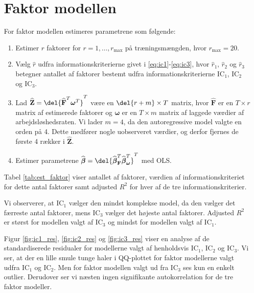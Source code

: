 \section{Faktor modellen}
For faktor modellen estimeres parametrene som følgende:
\begin{enumerate}
\item Estimer $r$ faktorer for $r = 1, \dots, r_{\max}$ på træningsmængden, hvor $r_{\max} = 20$.  
\item Vælg $\widehat{r}$ udfra informationskriterierne givet i \eqref{eq:ic1}-\eqref{eq:ic3}, hvor $\widehat{r}_1$, $\widehat{r}_2$ og $\widehat{r}_3$ betegner antallet af faktorer bestemt udfra informationskriterierne IC$_1$, IC$_2$ og IC$_3$.
\item Lad \(\widehat{\textbf{Z}} = \del{\widehat{{\textbf{F}}}^T\boldsymbol{\omega}^T}^T\) være en \(\del{r+m} \times T\) matrix, hvor \(\widehat{{\textbf{F}}}\) er en \(T \times r\) matrix af estimerede faktorer og \(\boldsymbol{\omega}\) er en \(T \times m\) matrix af laggede værdier af arbejdsløshedsraten.
Vi lader \(m = 4\), da den autoregressive model valgte en orden på 4.
Dette medfører nogle uobserveret værdier, og derfor fjernes de første 4 rækker i \(\widehat{\textbf{Z}}\).
\item Estimer parametrene $\widehat{\boldsymbol{\beta}} = \del{ \widehat{\boldsymbol{\beta}}^T_{\textbf{F}} \widehat{\boldsymbol{\beta}}^T_{\boldsymbol{\omega}}}^T$ med OLS.
\end{enumerate}

Tabel \ref{tab:est_faktor} viser antallet af faktorer, værdien af informationskriteriet for dette antal faktorer samt adjusted \(R^2\) for hver af de tre informationskriterier. 


Vi observerer, at IC$_1$ vælger den mindst komplekse model, da den vælger det færreste antal faktorer, mens IC$_3$ vælger det højeste antal faktorer. 
Adjusted \(R^2\) er størst for modellen valgt af IC$_3$ og mindst for modellen valgt af IC$_1$.

Figur \ref{fig:ic1_res}, \ref{fig:ic2_res} og \ref{fig:ic3_res} viser en analyse af de standardiserede residualer for modellerne valgt af henholdsvis IC$_1$, IC$_2$ og IC$_3$. 
Vi ser, at der en lille smule tunge haler i QQ-plottet for faktor modellerne valgt udfra IC$_1$ og IC$_2$. 
Men for faktor modellen valgt ud fra IC$_3$ ses kun en enkelt outlier. 
Derudover ser vi næsten ingen signifikante autokorrelation for de tre faktor modeller. 



